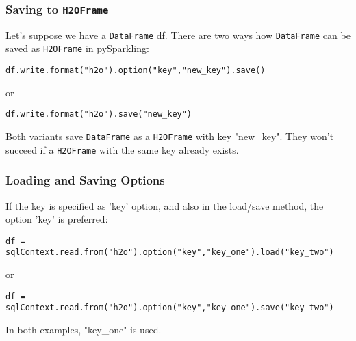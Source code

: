 \subsubsection{Saving to \texttt{H2OFrame}}

Let's suppose we have a \texttt{DataFrame} df. There are two ways how \texttt{DataFrame} can be saved as 
\texttt{H2OFrame} in pySparkling:

\begin{lstlisting}[style=Scala]
df.write.format("h2o").option("key","new_key").save()
\end{lstlisting}
or
\begin{lstlisting}[style=Scala]
df.write.format("h2o").save("new_key")
\end{lstlisting}

Both variants save \texttt{DataFrame} as a \texttt{H2OFrame} with key "new\_key". They won't succeed if a \texttt{H2OFrame} with the same key already exists.

\subsubsection{Loading and Saving Options}

If the key is specified as 'key' option, and also in the load/save method, the option 'key' is preferred:
\begin{lstlisting}[style=Scala]
df = sqlContext.read.from("h2o").option("key","key_one").load("key_two")
\end{lstlisting}
or
\begin{lstlisting}[style=Scala]
df = sqlContext.read.from("h2o").option("key","key_one").save("key_two")
\end{lstlisting}

In both examples, "key\_one" is used.



